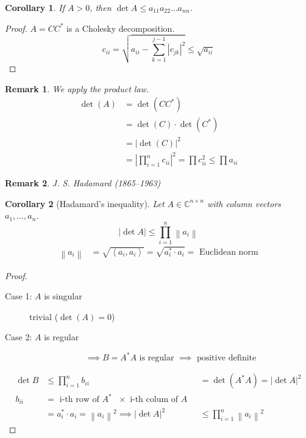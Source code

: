 \documentclass{article}
\newtheorem{remark}{Remark}  \numberwithin{remark}{section}
\newtheorem*{corollary}{Corollary}%
\newcommand{\angel}[1]{\left\langle#1\right\rangle}
\newcommand{\norm}[1]{\left\|#1\right\|}
\newcommand{\card}[1]{\left|#1\right|}
\begin{document}
\begin{corollary} %
  If $A > 0$, then $\det{A} \leq a_{11} a_{22} \dots a_{nn}$.
\end{corollary}

\begin{proof}
  $A = CC^*$ is a Cholesky decomposition.
  \[ c_{ii} = \sqrt{a_{ii} - \sum_{k=1}^{j-1} \card{c_{jk}}^2} \leq \sqrt{a_{ii}} \]
\end{proof}

\begin{remark}
  We apply the product law.
  \begin{align*}
    \det(A) &= \det(C C^*) \\
      &= \det(C) \cdot \det(C^*) \\
      &= \card{\det(C)}^2 \\
      &= \card{\prod_{i=1}^n c_{ii}}^2 = \prod c_{ii}^2 \leq \prod a_{ii}
  \end{align*}
\end{remark}

\begin{remark}
  J. S. Hadamard (1865--1963)
\end{remark}

\begin{corollary}[Hadamard's inequality] %
  Let $A \in \mathbb C^{n \times n}$ with column vectors $a_1, \dots, a_n$.
  \[ \card{\det{A}} \leq \prod_{i=1}^n \norm{a_{i}} \]
  \begin{align*}
    \norm{a_i} &= \sqrt{\angel{a_i, a_i}} = \sqrt{a_i^* \cdot a_i} = \text{ Euclidean norm}
  \end{align*}
\end{corollary}

\begin{proof}
  \begin{description}
    \item[Case 1: $A$ is singular]
      trivial ($\det(A) = 0$)
    \item[Case 2: $A$ is regular]
      \[ \implies B = A^* A \text{ is regular } \implies \text{ positive definite} \]
  \end{description}
  \begin{align*}
    \det{B} &\leq \prod_{i=1}^n b_{ii}
            &= \det(A^* A) = \card{\det{A}}^2 \\
    b_{ii}  &= \text{ i-th row of $A^*$ } \times \text{ i-th colum of $A$ } \\
            &= a_i^* \cdot a_i = \norm{a_i}^2
    \implies \card{\det{A}}^2 &\leq \prod_{i=1}^n \norm{a_i}^2
  \end{align*}
\end{proof}
\end{document}
